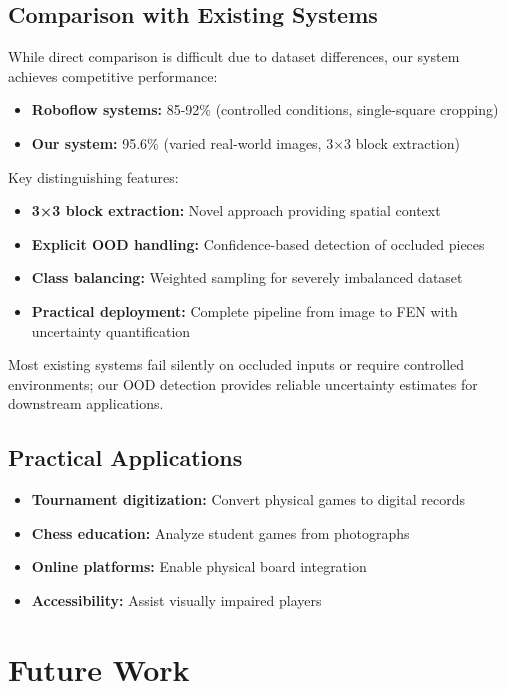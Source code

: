 \documentclass[conference]{IEEEtran}
\begin{document}
\subsection{Comparison with Existing Systems}

While direct comparison is difficult due to dataset differences, our system achieves competitive performance:
\begin{itemize}
    \item \textbf{Roboflow systems:} 85-92\% (controlled conditions, single-square cropping)
    \item \textbf{Our system:} 95.6\% (varied real-world images, 3×3 block extraction)
\end{itemize}

Key distinguishing features:
\begin{itemize}
    \item \textbf{3×3 block extraction:} Novel approach providing spatial context
    \item \textbf{Explicit OOD handling:} Confidence-based detection of occluded pieces
    \item \textbf{Class balancing:} Weighted sampling for severely imbalanced dataset
    \item \textbf{Practical deployment:} Complete pipeline from image to FEN with uncertainty quantification
\end{itemize}

Most existing systems fail silently on occluded inputs or require controlled environments; our OOD detection provides reliable uncertainty estimates for downstream applications.

\subsection{Practical Applications}

\begin{itemize}
    \item \textbf{Tournament digitization:} Convert physical games to digital records
    \item \textbf{Chess education:} Analyze student games from photographs
    \item \textbf{Online platforms:} Enable physical board integration
    \item \textbf{Accessibility:} Assist visually impaired players
\end{itemize}

\section{Future Work}
\end{document}
